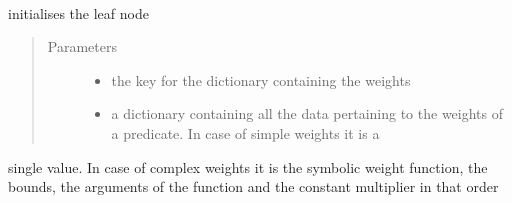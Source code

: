 \documentclass[letterpaper,10pt,english,openany,oneside]{sphinxmanual}
\begin{document}

\begin{fulllineitems}
\label{\detokenize{index:circuit.LeafNode}}~

\begin{fulllineitems}
\label{\detokenize{index:circuit.LeafNode.__init__}}
initialises the leaf node
\begin{quote}\begin{description}
\item[{Parameters}] \leavevmode\begin{itemize}
\item {} 
 \textendash{} the key for the dictionary containing the weights

\item {} 
 \textendash{} a dictionary containing all the data pertaining to the weights of a predicate. In case of simple weights it is a

\end{itemize}

\end{description}\end{quote}

single value. In case of complex weights it is the symbolic weight function, the bounds, the arguments of the function and the
constant multiplier in that order

\end{fulllineitems}



\end{fulllineitems}
\end{document}
